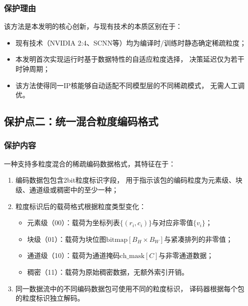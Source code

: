 \documentclass[a4paper,12pt,fontset=ubuntu]{ctexart}
\begin{document}
\subsubsection{保护理由}

该方法是本发明的核心创新，与现有技术的本质区别在于：

\begin{itemize}
  \item 现有技术（NVIDIA 2:4、SCNN等）均为编译时/训练时静态确定稀疏粒度；
  \item 本发明首次实现运行时基于数据特性的自适应粒度选择，
        决策延迟仅为若干时钟周期；
  \item 该方法使得同一IP核能够自动适配不同模型层的不同稀疏模式，
        无需人工调优。
\end{itemize}

\subsection{保护点二：统一混合粒度编码格式}

\subsubsection{保护内容}

一种支持多粒度混合的稀疏编码数据格式，其特征在于：

\begin{enumerate}
  \item 编码数据包包含2bit粒度标识字段，
        用于指示该包的编码粒度为元素级、块级、通道级或稠密中的至少一种；

  \item 粒度标识后的载荷格式根据粒度类型变化：
        \begin{itemize}
          \item 元素级（00）：载荷为坐标列表$\{(r_i, c_i)\}$与对应非零值$\{v_i\}$；
          \item 块级（01）：载荷为块位图$\text{bitmap}[B_H \times B_W]$与紧凑排列的非零值；
          \item 通道级（10）：载荷为通道掩码$\text{ch\_mask}[C]$与非零通道数据；
          \item 稠密（11）：载荷为原始稠密数据，无额外索引开销。
        \end{itemize}

  \item 同一数据流中的不同编码数据包可使用不同的粒度标识，
        译码器根据每个包的粒度标识独立解码。
\end{enumerate}
\end{document}
